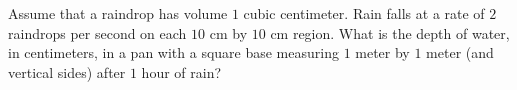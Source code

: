 Assume that a raindrop has volume $1$ cubic centimeter. Rain falls at a rate of $2$ raindrops per second on each $10$ cm by $10$ cm region. What is the depth of water, in centimeters, in a pan with a square base measuring $1$ meter by $1$ meter (and vertical sides) after $1$ hour of rain?
